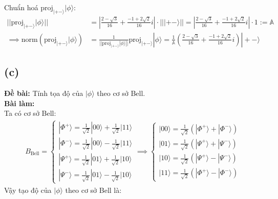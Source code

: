 Chuẩn hoá $\mathrm{proj}_{|+-\rangle}|\phi\rangle$:
\begin{align*}
    ||\mathrm{proj}_{|+-\rangle}|\phi\rangle||                     & = \left|\frac{2 - \sqrt{3}}{16} + \frac{-1 + 2\sqrt{2}}{16}i\right| \cdot |||+-\rangle|| = \left|\frac{2 - \sqrt{3}}{16} + \frac{-1 + 2\sqrt{2}}{16}i\right| \cdot 1 := \mathbb{A}               \\
    \implies \mathrm{norm}(\mathrm{proj}_{|+-\rangle}|\phi\rangle) & = \frac{1}{||\mathrm{proj}_{|+-\rangle}|\phi\rangle||} \mathrm{proj}_{|+-\rangle}|\phi\rangle = \frac{1}{\mathbb{A}} \left(\frac{2 - \sqrt{3}}{16} + \frac{-1 + 2\sqrt{2}}{16}i\right)|+-\rangle
\end{align*}

\subsection{(c)}
\textbf{Đề bài:} Tính tọa độ của $|\phi\rangle$ theo cơ sở Bell.\\
\textbf{Bài làm:}\\
Ta có cơ sở Bell:
\begin{align*}
    B_{\mathrm{Bell}} = \begin{cases}
                            |\Phi^{+}\rangle = \frac{1}{\sqrt{2}}|00\rangle +  \frac{1}{\sqrt{2}}|11\rangle \\
                            |\Phi^{-}\rangle = \frac{1}{\sqrt{2}}|00\rangle -  \frac{1}{\sqrt{2}}|11\rangle \\
                            |\Psi^{+}\rangle = \frac{1}{\sqrt{2}}|01\rangle +  \frac{1}{\sqrt{2}}|10\rangle \\
                            |\Psi^{-}\rangle = \frac{1}{\sqrt{2}}|01\rangle -  \frac{1}{\sqrt{2}}|10\rangle
                        \end{cases}
    \implies
    \begin{cases}
        |00\rangle = \frac{1}{\sqrt{2}}(|\Phi^{+}\rangle + |\Phi^{-}\rangle) \\
        |01\rangle = \frac{1}{\sqrt{2}}(|\Psi^{+}\rangle + |\Psi^{-}\rangle) \\
        |10\rangle = \frac{1}{\sqrt{2}}(|\Psi^{+}\rangle - |\Psi^{-}\rangle) \\
        |11\rangle = \frac{1}{\sqrt{2}}(|\Phi^{+}\rangle - |\Phi^{-}\rangle)
    \end{cases}
\end{align*}
Vậy tạo độ của $|\phi\rangle$ theo cơ sở Bell là:
